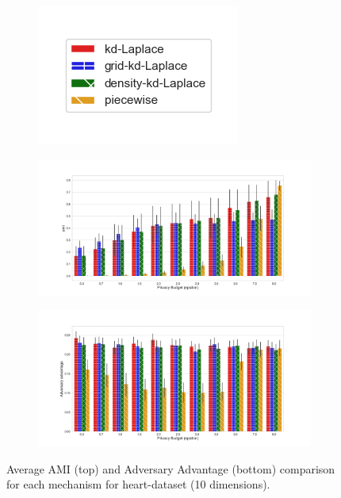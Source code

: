\begin{figure}[H]
    \centering
    \begin{subfigure}{0.30\textwidth}
        \includegraphics[width=\textwidth]{Results/kd-laplace/ami_bar_comparison_legend.png}
    \end{subfigure}
    \begin{subfigure}{1\textwidth}
        \includegraphics[width=1\textwidth]{Results/kd-laplace/ami_heart-dataset_comparison.png}
    \end{subfigure}
    \begin{subfigure}{1\textwidth}
        \includegraphics[width=1\textwidth]{Results/kd-laplace/shokri_mi_adv_heart-dataset_comparison.png}
    \end{subfigure}
    \caption{Average AMI (top) and Adversary Advantage (bottom) comparison for each mechanism for heart-dataset (10 dimensions).}
    \label{fig:utility_heart-dataset_comparison_nd_plot}
\end{figure}
\newpage

